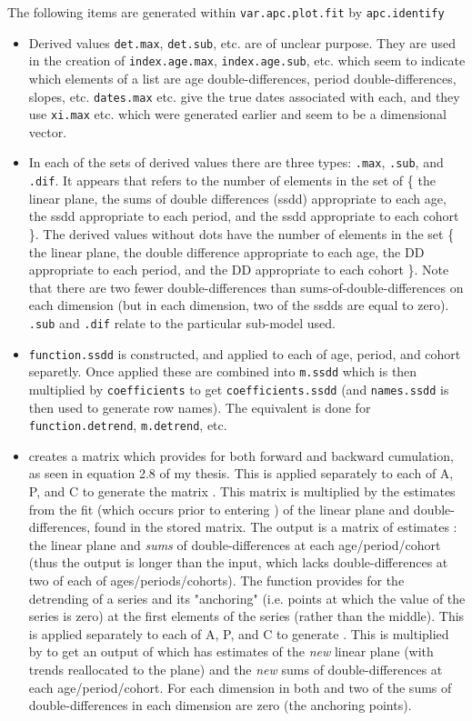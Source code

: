 \documentclass{article}
\begin{document}
The following items are generated within \texttt{var.apc.plot.fit} by \texttt{apc.identify}
\begin{itemize}
\item Derived values \texttt{det.max}, \texttt{det.sub}, etc. are of unclear purpose. They are used in the creation of \texttt{index.age.max}, \texttt{index.age.sub}, etc. which seem to indicate which elements of a list are age double-differences, period double-differences, slopes, etc. \texttt{dates.max} etc. give the true dates associated with each, and they use \texttt{xi.max} etc. which were generated earlier and seem to be a dimensional vector. 
\item In each of the sets of derived values there are three types: \texttt{.max}, \texttt{.sub}, and \texttt{.dif}. It appears that  refers to the number of elements in the set of \{ the linear plane, the sums of double differences (ssdd) appropriate to each age, the ssdd appropriate to each period, and the ssdd appropriate to each cohort \}. The derived values without dots have the number of elements in the set \{ the linear plane, the double difference appropriate to each age, the DD appropriate to each period, and the DD appropriate to each cohort \}. Note that there are two fewer double-differences than sums-of-double-differences on each dimension (but in each dimension, two of the ssdds are equal to zero). \texttt{.sub} and \texttt{.dif} relate to the particular sub-model used.
\item \texttt{function.ssdd} is constructed, and applied to each of age, period, and cohort separetly. Once applied these are combined into \texttt{m.ssdd} which is then multiplied by \texttt{coefficients} to get \texttt{coefficients.ssdd} (and \texttt{names.ssdd} is then used to generate row names). The equivalent is done for \texttt{function.detrend}, \texttt{m.detrend}, etc.
\item {} creates a matrix which provides for both forward and backward cumulation, as seen in equation 2.8 of my thesis. This is applied separately to each of A, P, and C to generate the matrix . This matrix is multiplied by the estimates from the fit (which occurs prior to entering ) of the linear plane and double-differences, found in the stored  matrix. The output is a matrix of estimates : the linear plane and \emph{sums} of double-differences at each age/period/cohort (thus the output is longer than the input, which lacks double-differences at two of each of ages/periods/cohorts). The function  provides for the detrending of a series and its "anchoring" (i.e. points at which the value of the series is zero)  at the first elements of the series (rather than the middle). This is applied separately to each of A, P, and C to generate . This is multiplied by  to get an output of  which has estimates of the \emph{new} linear plane (with trends reallocated to the plane) and the \emph{new} sums of double-differences at each age/period/cohort. For each dimension in both  and  two of the sums of double-differences in each dimension are zero (the anchoring points).

\end{itemize}
\end{document}
